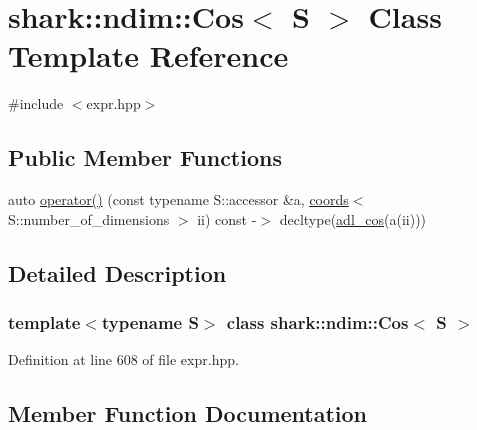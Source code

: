 \hypertarget{classshark_1_1ndim_1_1_cos}{}\section{shark\+:\+:ndim\+:\+:Cos$<$ S $>$ Class Template Reference}
\label{classshark_1_1ndim_1_1_cos}


{\ttfamily \#include $<$expr.\+hpp$>$}

\subsection*{Public Member Functions}
\begin{DoxyCompactItemize}
\item 
auto \hyperlink{classshark_1_1ndim_1_1_cos_a4245154af234d3d6287568766830eafb}{operator()} (const typename S\+::accessor \&a, \hyperlink{structshark_1_1ndim_1_1coords}{coords}$<$ S\+::number\+\_\+of\+\_\+dimensions $>$ ii) const -\/$>$ decltype(\hyperlink{namespaceshark_ae60244cfc7c72df7cbd33ab9fb90ff7e}{adl\+\_\+cos}(a(ii)))
\end{DoxyCompactItemize}


\subsection{Detailed Description}
\subsubsection*{template$<$typename S$>$\newline
class shark\+::ndim\+::\+Cos$<$ S $>$}



Definition at line 608 of file expr.\+hpp.



\subsection{Member Function Documentation}
\hypertarget{classshark_1_1ndim_1_1_cos_a4245154af234d3d6287568766830eafb}{}\label{classshark_1_1ndim_1_1_cos_a4245154af234d3d6287568766830eafb} 
